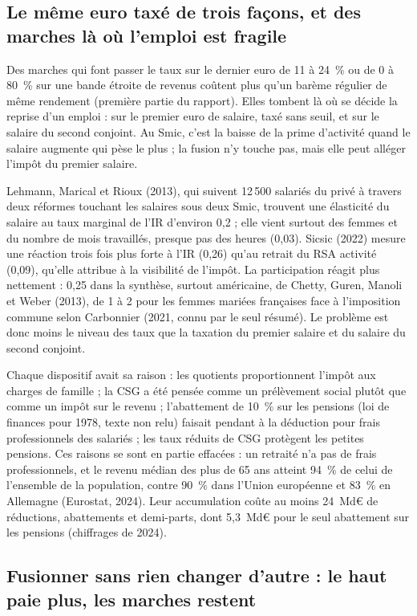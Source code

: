 \subsection{Le même euro taxé de trois façons, et des marches là où l'emploi est fragile}

Des marches qui font passer le taux sur le dernier euro de 11 à 24~\% ou de 0 à 80~\% sur une bande étroite de revenus
coûtent plus qu'un barème régulier de même rendement (première partie du rapport). Elles tombent là où se décide la
reprise d'un emploi : sur le premier euro de salaire, taxé sans seuil, et sur le salaire du second conjoint. Au Smic,
c'est la baisse de la prime d'activité quand le salaire augmente qui pèse le plus ; la fusion n'y touche pas, mais elle
peut alléger l'impôt du premier salaire.

Lehmann, Marical et Rioux (2013), qui suivent 12\,500 salariés du privé à travers deux réformes touchant les salaires
sous deux Smic, trouvent une élasticité du salaire au taux marginal de l'IR d'environ 0,2 ; elle vient surtout des
femmes et du nombre de mois travaillés, presque pas des heures (0,03). Sicsic (2022) mesure une réaction trois fois plus
forte à l'IR (0,26) qu'au retrait du RSA activité (0,09), qu'elle attribue à la visibilité de l'impôt. La participation
réagit plus nettement : 0,25 dans la synthèse, surtout américaine, de Chetty, Guren, Manoli et Weber (2013), de 1 à 2
pour les femmes mariées françaises face à l'imposition commune selon Carbonnier (2021, connu par le seul résumé). Le
problème est donc moins le niveau des taux que la taxation du premier salaire et du salaire du second conjoint.

Chaque dispositif avait sa raison : les quotients proportionnent l'impôt aux charges de famille ; la CSG a été pensée
comme un prélèvement social plutôt que comme un impôt sur le revenu ; l'abattement de 10~\% sur les pensions (loi de
finances pour 1978, texte non relu) faisait pendant à la déduction pour frais professionnels des salariés ; les taux
réduits de CSG protègent les petites pensions. Ces raisons se sont en partie effacées : un retraité n'a pas de frais
professionnels, et le revenu médian des plus de 65 ans atteint 94~\% de celui de l'ensemble de la population, contre
90~\% dans l'Union européenne et 83~\% en Allemagne (Eurostat, 2024). Leur accumulation coûte au moins 24~Md€ de
réductions, abattements et demi-parts, dont 5,3~Md€ pour le seul abattement sur les pensions (chiffrages de 2024).

\subsection{Fusionner sans rien changer d'autre : le haut paie plus, les marches restent}

